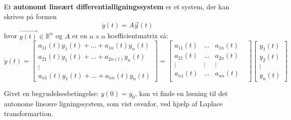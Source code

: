 \begin{definition}\label{LinSys}
Et \textbf{autonomt lineært differentialligningssystem} er et system, der kan skrives på formen
\begin{equation} \label{linsys}
    \dot{y}(t) = A \vec{y}(t)
\end{equation}
hvor $\vec{y(t)} \in \mathbb{R}^n$ og $A$ er en $n\times n$ koefficientmatrix så:
$$\dot{y}(t)
=
\begin{bmatrix}
a_{11}(t)y_1(t)+ \hdots + a_{1n}(t)y_n(t)\\
a_{21}(t)y_1(t)+ \hdots + a_{2n(t)}y_n(t)\\
\vdots \\
a_{n1}(t)y_1(t)+ \hdots + a_{nn}(t)y_n(t)
\end{bmatrix}
=
\begin{bmatrix}
a_{11}(t) & \hdots & a_{1n}(t) \\
a_{21}(t) & \hdots & a_{2n}(t) \\
\vdots & \vdots & \vdots & \\
a_{n1}(t) & \hdots & a_{nn}(t) \\
\end{bmatrix}
\begin{bmatrix}
y_1(t)\\
y_2(t)\\
\vdots\\
y_n(t)
\end{bmatrix}$$
\end{definition}
\hfill \break
Givet en begyndelsesbetingelse: $y(0) = y_0$, kan vi finde en løsning til det autonome lineære ligningssystem, som vist ovenfor, ved hjælp af Laplace transformartion. 

